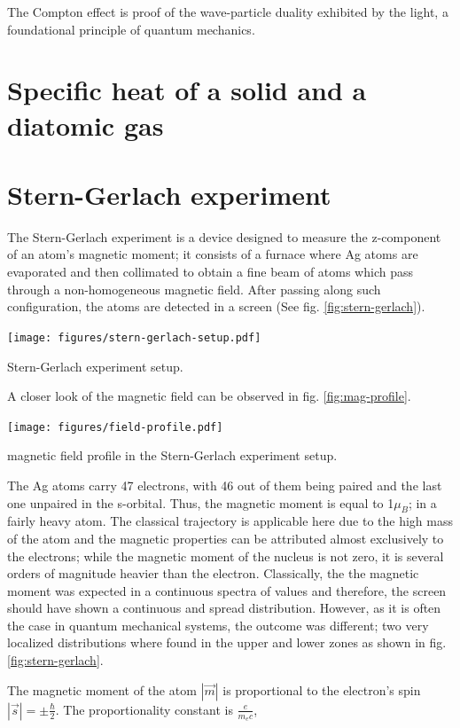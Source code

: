 \documentclass{article}
\begin{document}
The Compton effect is proof of the wave-particle duality exhibited by the light, a foundational principle of quantum mechanics.

\section{Specific heat of a solid and a diatomic gas}


\section{Stern-Gerlach experiment}
The Stern-Gerlach experiment is a device designed to measure the z-component of an atom's magnetic moment; it consists of a furnace where Ag atoms are evaporated and then collimated to obtain a fine beam of atoms which pass through a non-homogeneous magnetic field. After passing along such configuration, the atoms are detected in a screen (See fig. \ref{fig:stern-gerlach}). 
\begin{marginfigure}%
  \texttt{[image: figures/stern-gerlach-setup.pdf]}
  \caption{Stern-Gerlach experiment setup.}
  \label{fig:stern-gerlach}
\end{marginfigure}
A closer look of the magnetic field can be observed in fig. \ref{fig:mag-profile}.
\begin{marginfigure}%
  \texttt{[image: figures/field-profile.pdf]}
  \caption{magnetic field profile in the Stern-Gerlach experiment setup.}
  \label{fig:mag-profile}
\end{marginfigure}
The Ag atoms carry 47 electrons, with 46 out of them being paired and the last one unpaired in the s-orbital. Thus, the magnetic moment is equal to 1$\mu_B$; in a fairly heavy atom. The classical trajectory is applicable here due to the high mass of the atom and the magnetic properties can be attributed almost exclusively to the electrons; while the magnetic moment of the nucleus is not zero, it is several orders of magnitude heavier than the electron.
Classically, the the magnetic moment was expected in a continuous spectra of values and therefore, the screen should have shown a continuous and spread distribution. However, as it is often the case in quantum mechanical systems, the outcome was different; two very localized distributions where found in the upper and lower zones as shown in fig. \ref{fig:stern-gerlach}.

The magnetic moment of the atom $\left|\vec{m}\right|$ is proportional to the electron's spin $\left|\vec{s}\right|=\pm\frac{\hbar}{2}$. The proportionality constant is $\frac{e}{m_ec}$, 
\end{document}
